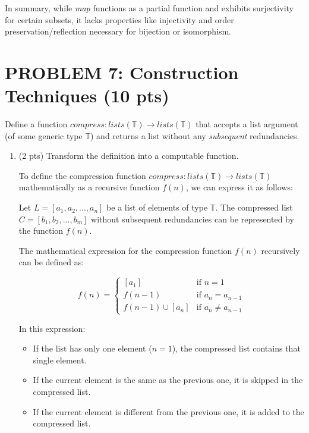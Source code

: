 \documentclass[12pt]{article}
\begin{document}
\begin{spacing}{1.5}
     \noindent In summary, while \textit{map} functions as a partial function and exhibits surjectivity for certain subsets, it lacks properties like injectivity and order preservation/reflection necessary for bijection or isomorphism.
	    
	\newpage
	\section*{PROBLEM 7: Construction Techniques (10 pts)}

    Define a function $compress : lists(\mathbb{T}) \rightarrow lists(\mathbb{T})$ that accepts a list argument (of some generic type $\mathbb{T}$) and returns a list without any \textit{subsequent} redundancies.

    \begin{enumerate}
        \item (2 pts) Transform the definition into a computable function.

        To define the compression function $compress : lists(\mathbb{T}) \rightarrow lists(\mathbb{T})$ mathematically as a recursive function $f(n)$, we can express it as follows:

        Let $L = [a_1, a_2, ..., a_n]$ be a list of elements of type $\mathbb{T}$.
        The compressed list $C = [b_1, b_2, ..., b_m]$ without subsequent redundancies can be represented by the function $f(n)$.
    
        The mathematical expression for the compression function $f(n)$ recursively can be defined as:
        
        $$f(n)=\begin{cases}
            [a_1]&\text{if }n=1\\
            f(n-1)&\text{if }a_n=a_{n-1}\\
            f(n-1)\cup [a_n]&\text{if }a_n\neq a_{n-1}
        \end{cases}$$
            
        In this expression:
    
        \begin{itemize}
            \item If the list has only one element ($n = 1$), the compressed list contains that single element.

            \item If the current element is the same as the previous one, it is skipped in the compressed list.

            \item If the current element is different from the previous one, it is added to the compressed list.
        \end{itemize}


\end{enumerate}
\end{spacing}
\end{document}
